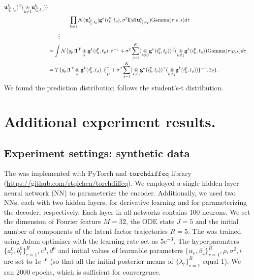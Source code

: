 \begin{equation}
\begin{split}
 \mathbf{u}^{k}_{i_k^p, t_p})^{\mathrm{T}}(\underset{k\ne 1}{\circledast} 
 \mathbf{u}^{k}_{i_k^p, t_p}) )\\& \qquad \qquad\prod_{k\ne 1} \mathcal{N}(\mathbf{u}^{k}_{i_k^p, t_p}|\mathbf{g}^k(i_k^p, t_p),\sigma^2\mathbf{I})d(\mathbf{u}^{k}_{i_k^p, t_p}) \text{Gamma}(\tau|\rho, \iota)d\tau\\
 &\qquad \vdots \\
 &=\int \mathcal{N}\big(y_p|\boldsymbol{1}^{\mathrm{T}}\underset{k}{\circledast} 
 \mathbf{g}^k(i_k^p, t_p), \tau^{-1}+ \sigma^2\sum_{j=1}^K(\underset{k\ne j}{\circledast} 
 \mathbf{g}^k(i_k^p, t_p))^{\mathrm{T}}(\underset{k\ne j}{\circledast} 
 \mathbf{g}^k(i_k^p, t_p)\big) \text{Gamma}(\tau|\rho, \iota)d\tau \\
 &= \mathcal{T}\big(y_p|\boldsymbol{1}^{\mathrm{T}}\underset{k}{\circledast} 
 \mathbf{g}^k(i_k^p, t_p),  \{\frac{\iota}{\rho}+\sigma^2\sum_{j=1}^K(\underset{k\ne j}{\circledast} 
 \mathbf{g}^k(i_k^p, t_p))^{\mathrm{T}}(\underset{k\ne j}{\circledast} 
 \mathbf{g}^k(i_k^p, t_p))\}^{-1}, 2\rho\big).
    \end{split}
\end{equation}
We found the prediction distribution follows the student's-t distribution.




\newpage
\section{Additional experiment results.}
\subsection{Experiment settings: synthetic data}
\label{ap:setting1}
The \MODEL  was implemented with PyTorch \cite{paszke2019pytorch} and $\texttt{torchdiffeq}$ library (\url{https://github.com/rtqichen/torchdiffeq}). We employed a single hidden-layer neural network (NN) to parameterize the encoder. Additionally, we used two  NNs, each with two hidden layers, for derivative learning and for parameterizing the decoder, respectively. Each layer in all networks contains 100 neurons.
  We set the dimension of Fourier feature $M=32$, the  ODE state $J=5$ and the initial number of components  of the latent factor trajectories $R=5$.  The \MODEL  was trained  using Adam \cite{kingma2014adam} optimizer with the learning rate set as $5e^{-3}$. The hyperparamters $\{a_r^0, b_r^0\}_{r=1}^{R},c^0, d^0$ and initial values of learnable parameters $\{\alpha_r, \beta_r\}_{r=1}^{R},\rho, \sigma^2,  \iota$ are  set to $1e^{-6}$ (so that all the initial posterior means of $\{\lambda_r\}_{r=1}^{R}$ equal $1$). We ran 2000 epochs, which is sufficient for convergence.
  
